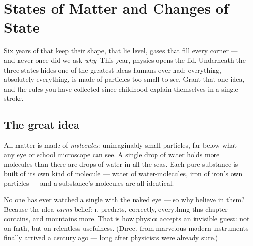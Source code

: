 \chapter{States of Matter and Changes of State}\label{ch:g7:states-of-matter}

Six years of  that keep their shape,  that lie level,
gases that fill every corner --- and never once did we ask
\emph{why}. This year, physics opens the lid. Underneath the three
states hides one of the greatest ideas humans ever had: everything,
absolutely everything, is made of particles too small to see. Grant
that one idea, and the rules you have collected since childhood
explain themselves in a single stroke.

\section{The great idea}

\begin{definition}[Molecules]\label{def:g7:states-of-matter:molecule}
All matter is made of \emph{molecules}:
unimaginably small particles, far below what any eye or school
microscope can see. A single drop of water holds more molecules
than there are drops of water in all the seas. Each pure substance
is built of its own kind of molecule --- water of water-molecules,
iron of iron's own particles --- and a substance's molecules are
all identical.
\end{definition}

\begin{remark}\label{rem:g7:states-of-matter:believing}
No one has ever watched a single  with the naked eye ---
so why believe in them? Because the idea \emph{earns} belief: it
predicts, correctly, everything this chapter contains, and
mountains more. That is how physics accepts an invisible guest:
not on faith, but on relentless usefulness. (Direct  from
marvelous modern instruments finally arrived a century ago ---
long after physicists were already sure.)
\end{remark}

